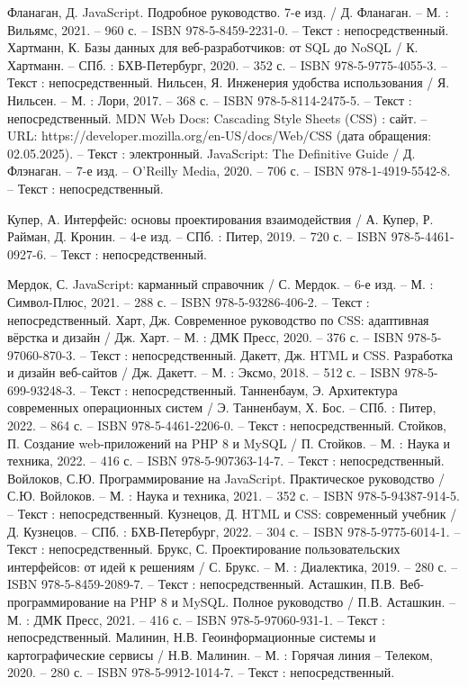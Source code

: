 \begin{thebibliography}{21}
 	 Фланаган, Д. JavaScript. Подробное руководство. 7-е изд. / Д. Фланаган. – М. : Вильямс, 2021. – 960 с. – ISBN 978-5-8459-2231-0. – Текст : непосредственный.
		Хартманн, К. Базы данных для веб-разработчиков: от SQL до NoSQL / К. Хартманн. – СПб. : БХВ-Петербург, 2020. – 352 с. – ISBN 978-5-9775-4055-3. – Текст : непосредственный. 
	 Нильсен, Я. Инженерия удобства использования / Я. Нильсен. – М. : Лори, 2017. – 368 с. – ISBN 978-5-8114-2475-5. – Текст : непосредственный.
	 MDN Web Docs: Cascading Style Sheets (CSS) : сайт. – URL: https://developer.mozilla.org/en-US/docs/Web/CSS (дата обращения: 02.05.2025). – Текст : электронный.
	 JavaScript: The Definitive Guide / Д. Флэнаган. – 7-е изд. – O’Reilly Media, 2020. – 706 с. – ISBN 978-1-4919-5542-8. – Текст : непосредственный.
	
	 Купер, А. Интерфейс: основы проектирования взаимодействия / А. Купер, Р. Райман, Д. Кронин. – 4-е изд. – СПб. : Питер, 2019. – 720 с. – ISBN 978-5-4461-0927-6. – Текст : непосредственный.
	
	 Мердок, С. JavaScript: карманный справочник / С. Мердок. – 6-е изд. – М. : Символ-Плюс, 2021. – 288 с. – ISBN 978-5-93286-406-2. – Текст : непосредственный.
	 Харт, Дж. Современное руководство по CSS: адаптивная вёрстка и дизайн / Дж. Харт. – М. : ДМК Пресс, 2020. – 376 с. – ISBN 978-5-97060-870-3. – Текст : непосредственный.
	 Дакетт, Дж. HTML и CSS. Разработка и дизайн веб-сайтов / Дж. Дакетт. – М. : Эксмо, 2018. – 512 с. – ISBN 978-5-699-93248-3. – Текст : непосредственный.
	 Танненбаум, Э. Архитектура современных операционных систем / Э. Танненбаум, Х. Бос. – СПб. : Питер, 2022. – 864 с. – ISBN 978-5-4461-2206-0. – Текст : непосредственный.
	 Стойков, П. Создание web-приложений на PHP 8 и MySQL / П. Стойков. – М. : Наука и техника, 2022. – 416 с. – ISBN 978-5-907363-14-7. – Текст : непосредственный.
	 Войлоков, С.Ю. Программирование на JavaScript. Практическое руководство / С.Ю. Войлоков. – М. : Наука и техника, 2021. – 352 с. – ISBN 978-5-94387-914-5. – Текст : непосредственный.
	 Кузнецов, Д. HTML и CSS: современный учебник / Д. Кузнецов. – СПб. : БХВ-Петербург, 2022. – 304 с. – ISBN 978-5-9775-6014-1. – Текст : непосредственный.
	 Брукс, С. Проектирование пользовательских интерфейсов: от идей к решениям / С. Брукс. – М. : Диалектика, 2019. – 280 с. – ISBN 978-5-8459-2089-7. – Текст : непосредственный.
	 Асташкин, П.В. Веб-программирование на PHP 8 и MySQL. Полное руководство / П.В. Асташкин. – М. : ДМК Пресс, 2021. – 416 с. – ISBN 978-5-97060-931-1. – Текст : непосредственный.
	 Малинин, Н.В. Геоинформационные системы и картографические сервисы / Н.В. Малинин. – М. : Горячая линия – Телеком, 2020. – 280 с. – ISBN 978-5-9912-1014-7. – Текст : непосредственный.

\end{thebibliography}
